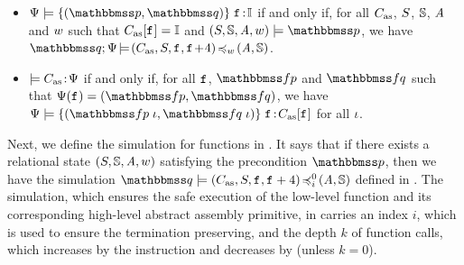 \begin{definition}
	\label{def:soundness of instruction sequence}
    \mbox{}
    \begin{itemize}
    \item {\em $\semwfseqrel{\Cspec}{\relastP}{\relastQ}{\cblk}$} if and only if, for all
    {\em $C_{\text{as}}$}, $S$, $\mathbb{S}$, $\textit{A}$ and $w$
    such that {\em $C_{\text{as}}[\texttt{f}_{}] = \mathbb{I}$}
    and $(\state, \hpstate, \primcom, \word) \models \relastP$, we have
    {\em $\simInsSeq{\relastQ}{\Cspec}
        {(\asmimp, \state, \lab{}, \lab{}\!+\!4)}{\word}{(\primcom, \hpstate)}$}.
    \item
    $\models C_{\text{as}} \!:\! \Psi$ if and only if, for all
    {\em $\texttt{f}_{}$}, $\relspecpre$ and $\relspecpost$ %
    such that {\em $\Cspec(\lab{}) = (\relspecpre, \relspecpost)$},
    we have {\em $\semwfseqrel{\Cspec}{\relspecpre \; \lgvl}{\relspecpost \; \lgvl}{\asmimp[\lab{}]}$}
    for all $\iota$.
    \end{itemize}
\end{definition}

Next, we define the simulation for functions in
\Def{\ref{def:simfunc}}. It says that if there
exists a relational state $(S, \mathbb{S}, \textit{A}, w)$
satisfying the precondition $\relastP$, then we have
the simulation
$\simFunctionSt{\relastQ}{(\asmimp, \state, \lab{}, \lab{} + 4)}
    {i}{0}{(\primcom, \hpstate)}$ defined in
\Def{\ref{def:sim-imp-prim-state}}.
The simulation, which ensures the safe execution of the low-level 
\sparc{} function and its corresponding high-level abstract assembly primitive, 
in \Def{\ref{def:sim-imp-prim-state}}
carries an index $i$,
which is used to ensure the termination preserving,
and the depth $k$ of function calls, which
increases by the \call{} instruction
and decreases by \retl{} (unless $k=0$).

